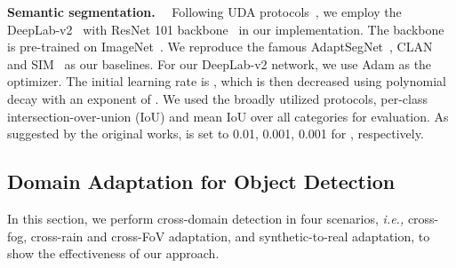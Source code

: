 \documentclass[10pt,journal,compsoc]{IEEEtran}
\renewcommand{\paragraph}[1]{\noindent\textbf{#1}~~}
\begin{document}
\paragraph{Semantic segmentation.}
Following UDA protocols~\cite{AdaptSegNet,CLAN,SIM}, we employ the DeepLab-v2~\cite{chen2017deeplab} with ResNet 101 backbone~\cite{he2016deep} in our implementation. The backbone is pre-trained on ImageNet~\cite{deng2009imagenet}. We reproduce the famous  AdaptSegNet~\cite{AdaptSegNet}, CLAN~\cite{CLAN,CLANv2} and SIM~\cite{SIM} as our baselines. For our DeepLab-v2 network, we use Adam as the optimizer. The initial learning rate is  , which is then decreased using polynomial decay with an exponent of . We used the broadly utilized protocols,
per-class intersection-over-union (IoU) and mean IoU over
all categories for evaluation. As suggested by the original works,  is set to 0.01, 0.001, 0.001 for \cite{AdaptSegNet,CLAN,SIM}, respectively.

\subsection{Domain Adaptation for Object Detection}
\label{sec:DAOD}
In this section, we perform cross-domain detection in four scenarios, \emph{i.e.,} cross-fog, cross-rain and cross-FoV adaptation, and  synthetic-to-real adaptation, to show the effectiveness of our approach. 

\begin{table}{}
\caption{Cross-fog adaptation of semantic segmentation from Cityscapes to Foggy Zurich++ (multi-domainness). }
\label{table:c2f_seg}
\centering
{}
\end{table}
\end{document}
